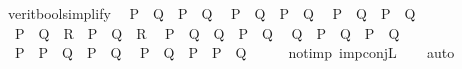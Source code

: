 \begin{isabellebody}
\ verit{\isacharunderscore}{\kern0pt}bool{\isacharunderscore}{\kern0pt}simplify{\isacharcolon}{\kern0pt}\isanewline
\ \ {\isacartoucheopen}{\isasymnot}{\isacharparenleft}{\kern0pt}P\ {\isasymlongrightarrow}\ Q{\isacharparenright}{\kern0pt}\ {\isasymlongleftrightarrow}\ P\ {\isasymand}\ {\isasymnot}Q{\isacartoucheclose}\isanewline
\ \ {\isacartoucheopen}{\isasymnot}{\isacharparenleft}{\kern0pt}P\ {\isasymor}\ Q{\isacharparenright}{\kern0pt}\ {\isasymlongleftrightarrow}\ {\isasymnot}P\ {\isasymand}\ {\isasymnot}Q{\isacartoucheclose}\isanewline
\ \ {\isacartoucheopen}{\isasymnot}{\isacharparenleft}{\kern0pt}P\ {\isasymand}\ Q{\isacharparenright}{\kern0pt}\ {\isasymlongleftrightarrow}\ {\isasymnot}P\ {\isasymor}\ {\isasymnot}Q{\isacartoucheclose}\isanewline
\ \ {\isacartoucheopen}{\isacharparenleft}{\kern0pt}P\ {\isasymlongrightarrow}\ {\isacharparenleft}{\kern0pt}Q\ {\isasymlongrightarrow}\ R{\isacharparenright}{\kern0pt}{\isacharparenright}{\kern0pt}\ {\isasymlongleftrightarrow}\ {\isacharparenleft}{\kern0pt}{\isacharparenleft}{\kern0pt}P\ {\isasymand}\ Q{\isacharparenright}{\kern0pt}\ {\isasymlongrightarrow}\ R{\isacharparenright}{\kern0pt}{\isacartoucheclose}\isanewline
\ \ {\isacartoucheopen}{\isacharparenleft}{\kern0pt}{\isacharparenleft}{\kern0pt}P\ {\isasymlongrightarrow}\ Q{\isacharparenright}{\kern0pt}\ {\isasymlongrightarrow}\ Q{\isacharparenright}{\kern0pt}\ {\isasymlongleftrightarrow}\ P\ {\isasymor}\ Q{\isacartoucheclose}\isanewline
\ \ {\isacartoucheopen}{\isacharparenleft}{\kern0pt}Q\ {\isasymlongleftrightarrow}\ {\isacharparenleft}{\kern0pt}P\ {\isasymor}\ Q{\isacharparenright}{\kern0pt}{\isacharparenright}{\kern0pt}\ {\isasymlongleftrightarrow}\ {\isacharparenleft}{\kern0pt}P\ {\isasymlongrightarrow}\ Q{\isacharparenright}{\kern0pt}{\isacartoucheclose}\ %
\isanewline
\ \ {\isacartoucheopen}P\ {\isasymand}\ {\isacharparenleft}{\kern0pt}P\ {\isasymlongrightarrow}\ Q{\isacharparenright}{\kern0pt}\ {\isasymlongleftrightarrow}\ P\ {\isasymand}\ Q{\isacartoucheclose}\isanewline
\ \ {\isacartoucheopen}{\isacharparenleft}{\kern0pt}P\ {\isasymlongrightarrow}\ Q{\isacharparenright}{\kern0pt}\ {\isasymand}\ P\ {\isasymlongleftrightarrow}\ P\ {\isasymand}\ Q{\isacartoucheclose}\isanewline
\ \isanewline
%
\isadelimproof
\ \ %
\endisadelimproof
%
\isatagproof
{}\isamarkupfalse%
\ not{\isacharunderscore}{\kern0pt}imp\ imp{\isacharunderscore}{\kern0pt}conjL\isanewline
\ \ \isamarkupfalse%
\ auto%
\endisatagproof
{\isafoldproof}%
%
\isadelimproof
%
\endisadelimproof
%
\begin{isamarkuptext}%

\end{isamarkuptext}
\end{isabellebody}
